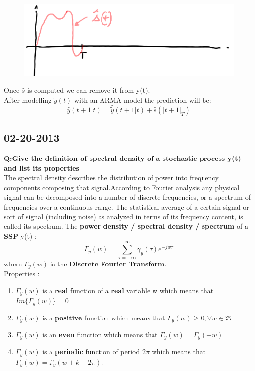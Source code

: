 \documentclass[12pt]{article} %
\begin{document}
\begin{figure}[H]
 \centering
  \includegraphics[width=.7\linewidth]{seasonal_est2}
\end{figure}
Once $\hat{s}$ is computed we can remove it from y(t).\\
After modelling $\tilde{y}(t)$ with an ARMA model the prediction will be:
\[
\boxed{\hat{y}(t+1|t) = \hat{\tilde{y}}(t+1|t) + \hat{s}(|t+1|_T)}
\]

\subsection{02-20-2013}
\textbf{Q:Give the definition of spectral density of a stochastic process y(t) and list its properties}
\vspace{2mm}\\
The spectral density describes the distribution of power into frequency components composing that signal.According to Fourier analysis any physical signal can be decomposed into a number of discrete frequencies, or a spectrum of frequencies over a continuous range. The statistical average of a certain signal or sort of signal (including noise) as analyzed in terms of its frequency content, is called its spectrum.
The \textbf{power density / spectral density / spectrum } of a \textbf{SSP} y(t) :
$$\Gamma_y(w) = \sum\limits_{\tau = -\infty}^{\infty} \gamma_y(\tau)e^{-jw\tau}$$
where $\Gamma_y(w)$ is the \textbf{Discrete Fourier Transform}.\\
Properties :
\begin{enumerate}
\item $\Gamma_y(w)$ is a \textbf{real} function of a \textbf{real} variable w which means that $Im\{\Gamma_y(w)\}=0$
\item $\Gamma_y(w)$ is a \textbf{positive} function which means that $\Gamma_y(w) \geq 0 , \forall w \in \Re$
\item $\Gamma_y(w)$ is an \textbf{even} function which means that $\Gamma_y(w) =\Gamma_y(-w)$
\item $\Gamma_y(w)$ is a \textbf{periodic} function of period $2\pi$ which means that $\Gamma_y(w) = \Gamma_y(w+k-2\pi)$.
\end{enumerate}
\end{document}
